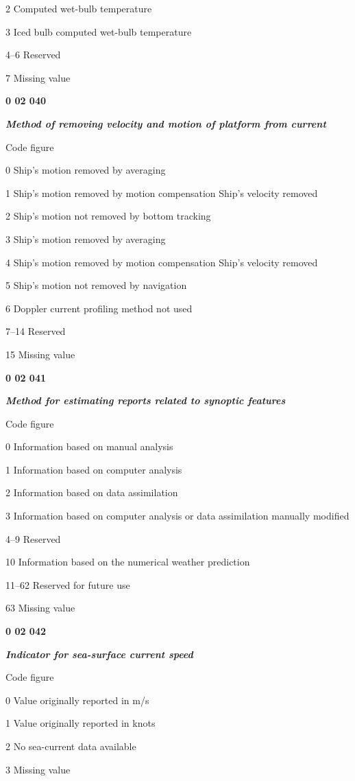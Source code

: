 2 Computed wet-bulb temperature

3 Iced bulb computed wet-bulb temperature

4--6 Reserved

7 Missing value

\textbf{0 02 040}

\emph{\textbf{Method of removing velocity and motion of platform from current}}

Code figure

0 Ship's motion removed by averaging

1 Ship's motion removed by motion compensation Ship's velocity removed

2 Ship's motion not removed by bottom tracking

3 Ship's motion removed by averaging

4 Ship's motion removed by motion compensation Ship's velocity removed

5 Ship's motion not removed by navigation

6 Doppler current profiling method not used

7--14 Reserved

15 Missing value

\textbf{0 02 041}

\emph{\textbf{Method for estimating reports related to synoptic features}}

Code figure

0 Information based on manual analysis

1 Information based on computer analysis

2 Information based on data assimilation

3 Information based on computer analysis or data assimilation manually modified

4--9 Reserved

10 Information based on the numerical weather prediction

11--62 Reserved for future use

63 Missing value

\textbf{0 02 042}

\emph{\textbf{Indicator for sea-surface current speed}}

Code figure

0 Value originally reported in m/s

1 Value originally reported in knots

2 No sea-current data available

3 Missing value

